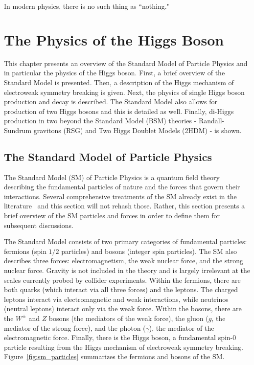 \begin{savequote}[75mm]
‎In modern physics, there is no such thing as ``nothing."
\end{savequote}

\chapter{The Physics of the Higgs Boson}

This chapter presents an overview of the Standard Model of Particle Physics and in particular the physics of the Higgs boson. First, a brief overview of the Standard Model is presented. Then, a description of the Higgs mechanism of electroweak symmetry breaking is given. Next, the physics of single Higgs boson production and decay is described. The Standard Model also allows for production of two Higgs bosons and this is detailed as well. Finally, di-Higgs production in two beyond the Standard Model (BSM) theories - Randall-Sundrum gravitons (RSG) and Two Higgs Doublet Models (2HDM) - is shown. 

\section{The Standard Model of Particle Physics}

The Standard Model (SM) of Particle Physics is a quantum field theory describing the fundamental particles of nature and the forces that govern their interactions. Several comprehensive treatments of the SM already exist in the literature~\cite{Griffiths,HalzenAndMartin,Tully,PDG,Schwartz,Dawson} and this section will not rehash those. Rather, this section presents a brief overview of the SM particles and forces in order to define them for subsequent discussions. 

The Standard Model consists of two primary categories of fundamental particles: fermions (spin $1/2$ particles) and bosons (integer spin particles). The SM also describes three forces: electromagnetism, the weak nuclear force, and the strong nuclear force. Gravity is not included in the theory and is largely irrelevant at the scales currently probed by collider experiments. Within the fermions, there are both quarks (which interact via all three forces) and the leptons. The charged leptons interact via electromagnetic and weak interactions, while neutrinos (neutral leptons) interact only via the weak force. Within the bosons, there are the $W^{\pm}$ and $Z$ bosons (the mediators of the weak force), the gluon ($g$, the mediator of the strong force), and the photon ($\gamma$), the mediator of the electromagnetic force. Finally, there is the Higgs boson, a fundamental spin-$0$ particle resulting from the Higgs mechanism of electroweak symmetry breaking.  Figure~\ref{fig:sm_particles} summarizes the fermions and bosons of the SM. 

